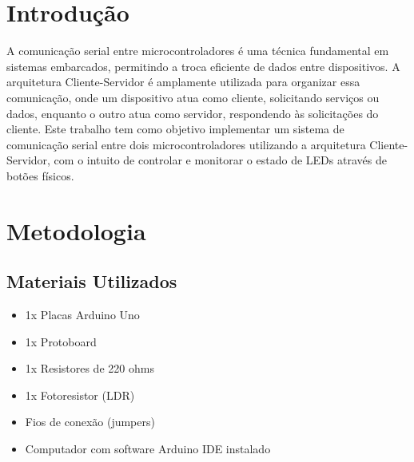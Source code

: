 \documentclass[12pt, a4paper]{article}
\begin{document}
\section{Introdução}
A comunicação serial entre microcontroladores é uma técnica fundamental em sistemas embarcados, permitindo a troca eficiente de dados entre dispositivos. A arquitetura Cliente-Servidor é amplamente utilizada para organizar essa comunicação, onde um dispositivo atua como cliente, solicitando serviços ou dados, enquanto o outro atua como servidor, respondendo às solicitações do cliente. Este trabalho tem como objetivo implementar um sistema de comunicação serial entre dois microcontroladores utilizando a arquitetura Cliente-Servidor, com o intuito de controlar e monitorar o estado de LEDs através de botões físicos.


\newpage

\newpage
\section{Metodologia}
\subsection{Materiais Utilizados}
\begin{itemize}
	\item 1x Placas Arduino Uno
	\item 1x Protoboard
	\item 1x Resistores de 220 ohms
	\item 1x Fotoresistor (LDR)
	\item Fios de conexão (jumpers)
	\item Computador com software Arduino IDE instalado
\end{itemize}
\end{document}
